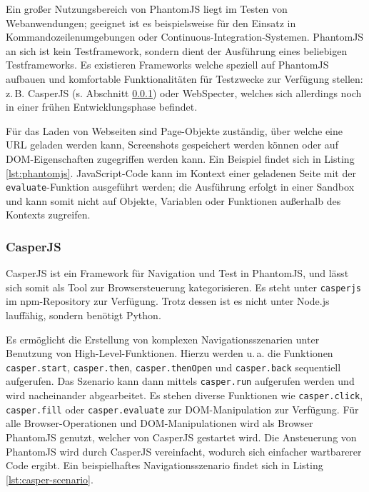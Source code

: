 Ein großer Nutzungsbereich von PhantomJS liegt im Testen von Webanwendungen; geeignet ist es beispielsweise für den Einsatz in Kommandozeilenumgebungen oder Continuous-Integration-Systemen. PhantomJS an sich ist kein Testframework, sondern dient der Ausführung eines beliebigen Testframeworks. Es existieren Frameworks welche speziell auf PhantomJS aufbauen und komfortable Funktionalitäten für Testzwecke zur Verfügung stellen: z.\,B. CasperJS (s. Abschnitt \ref{sec:CasperJS}) oder WebSpecter, welches sich allerdings noch in einer frühen Entwicklungsphase befindet.\cite{phantomjs-testing}

Für das Laden von Webseiten sind Page-Objekte zuständig, über welche eine URL geladen werden kann, Screenshots gespeichert werden können oder auf DOM-Eigenschaften zugegriffen werden kann. Ein Beispiel findet sich in Listing \ref{lst:phantomjs}. JavaScript-Code kann im Kontext einer geladenen Seite mit der \texttt{evaluate}-Funktion ausgeführt werden; die Ausführung erfolgt in einer Sandbox und kann somit nicht auf Objekte, Variablen oder Funktionen außerhalb des Kontexts zugreifen.\cite{phantomjs-quickstart}

\begin{figure}[H]
	
\end{figure}

\subsubsection{CasperJS}
\label{sec:CasperJS}
CasperJS ist ein Framework für Navigation und Test in PhantomJS, und lässt sich somit als Tool zur Browsersteuerung kategorisieren. Es steht unter \texttt{casperjs} im npm-Repository zur Verfügung.\cite{casperjs-index} Trotz dessen ist es nicht unter Node.js lauffähig\cite{casperjs-faq}, sondern benötigt Python\cite{casperjs-installation}.

Es ermöglicht die Erstellung von komplexen Navigationsszenarien unter Benutzung von High-Level-Funktionen. Hierzu werden u.\,a. die Funktionen \texttt{casper.start}, \texttt{casper.then}, \texttt{casper.thenOpen} und \texttt{casper.back} sequentiell aufgerufen. Das Szenario kann dann mittels \texttt{casper.run} aufgerufen werden und wird nacheinander abgearbeitet. Es stehen diverse Funktionen wie \texttt{casper.click}, \texttt{casper.fill} oder \texttt{casper.evaluate} zur DOM-Manipulation zur Verfügung. Für alle Browser-Operationen und DOM-Manipulationen wird als Browser PhantomJS genutzt, welcher von CasperJS gestartet wird. Die Ansteuerung von PhantomJS wird durch CasperJS vereinfacht, wodurch sich einfacher wartbarerer Code ergibt\cite{casperjs-better-phantomjs}. Ein beispielhaftes Navigationsszenario findet sich in Listing \ref{lst:casper-scenario}.\cite{casperjs-index}

